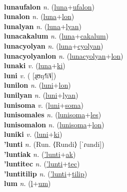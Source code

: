 \label{luna} \\
\textbf{lunaufalon} \textit{n.} (\hyperref[luna]{luna}+\hyperref[ufalon]{ufalon})
 \label{lunaufalon} \\
\textbf{lunalon} \textit{n.} (\hyperref[luna]{luna}+\hyperref[lon]{lon})
 \label{lunalon} \\
\textbf{lunalyan} \textit{n.} (\hyperref[luna]{luna}+\hyperref[lyan]{lyan})
 \label{lunalyan} \\
\textbf{lunacakalum} \textit{n.} (\hyperref[luna]{luna}+\hyperref[cakalum]{cakalum})
 \label{lunacakalum} \\
\textbf{lunacyolyan} \textit{n.} (\hyperref[luna]{luna}+\hyperref[cyolyan]{cyolyan})
 \label{lunacyolyan} \\
\textbf{lunacyolyanlon} \textit{n.} (\hyperref[lunacyolyan]{lunacyolyan}+\hyperref[lon]{lon})
 \label{lunacyolyanlon} \\
\textbf{lunaki} \textit{v.} (\hyperref[luna]{luna}+\hyperref[ki]{ki})
 \label{lunaki} \\
\textbf{luni} \textit{v.} ( [ɻʊŋ˧˥i˥˩])
 \label{luni} \\
\textbf{lunilon} \textit{n.} (\hyperref[luni]{luni}+\hyperref[lon]{lon})
 \label{lunilon} \\
\textbf{lunilyan} \textit{n.} (\hyperref[luni]{luni}+\hyperref[lyan]{lyan})
 \label{lunilyan} \\
\textbf{lunisoma} \textit{v.} (\hyperref[luni]{luni}+\hyperref[soma]{soma})
 \label{lunisoma} \\
\textbf{lunisomales} \textit{n.} (\hyperref[lunisoma]{lunisoma}+\hyperref[les]{les})
 \label{lunisomales} \\
\textbf{lunisomalon} \textit{n.} (\hyperref[lunisoma]{lunisoma}+\hyperref[lon]{lon})
 \label{lunisomalon} \\
\textbf{luniki} \textit{v.} (\hyperref[luni]{luni}+\hyperref[ki]{ki})
 \label{luniki} \\
\textbf{'lunti} \textit{n.} (Run. ⟨Rundi⟩ [ˈɾundi])
 \label{'lunti} \\
\textbf{'luntiak} \textit{n.} (\hyperref['lunti]{'lunti}+\hyperref[ak]{ak})
 \label{'luntiak} \\
\textbf{'luntitec} \textit{n.} (\hyperref['lunti]{'lunti}+\hyperref[tec]{tec})
 \label{'luntitec} \\
\textbf{'luntitilip} \textit{n.} (\hyperref['lunti]{'lunti}+\hyperref[tilip]{tilip})
 \label{'luntitilip} \\
\textbf{lum} \textit{n.} (\hyperref[l]{l}+\hyperref[um]{um})
